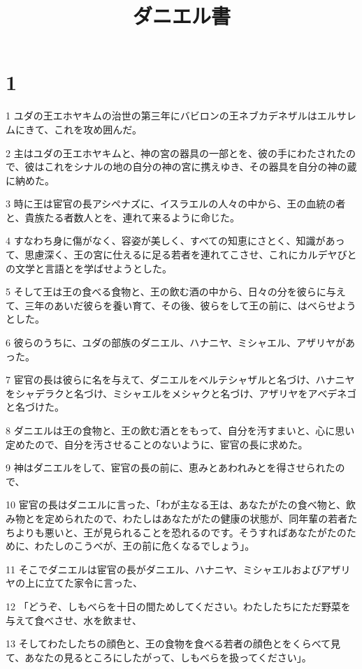 

\title{ダニエル書}


\chapter{1}

\par 1 ユダの王エホヤキムの治世の第三年にバビロンの王ネブカデネザルはエルサレムにきて、これを攻め囲んだ。
\par 2 主はユダの王エホヤキムと、神の宮の器具の一部とを、彼の手にわたされたので、彼はこれをシナルの地の自分の神の宮に携えゆき、その器具を自分の神の蔵に納めた。
\par 3 時に王は宦官の長アシペナズに、イスラエルの人々の中から、王の血統の者と、貴族たる者数人とを、連れて来るように命じた。
\par 4 すなわち身に傷がなく、容姿が美しく、すべての知恵にさとく、知識があって、思慮深く、王の宮に仕えるに足る若者を連れてこさせ、これにカルデヤびとの文学と言語とを学ばせようとした。
\par 5 そして王は王の食べる食物と、王の飲む酒の中から、日々の分を彼らに与えて、三年のあいだ彼らを養い育て、その後、彼らをして王の前に、はべらせようとした。
\par 6 彼らのうちに、ユダの部族のダニエル、ハナニヤ、ミシャエル、アザリヤがあった。
\par 7 宦官の長は彼らに名を与えて、ダニエルをベルテシャザルと名づけ、ハナニヤをシャデラクと名づけ、ミシャエルをメシャクと名づけ、アザリヤをアベデネゴと名づけた。
\par 8 ダニエルは王の食物と、王の飲む酒とをもって、自分を汚すまいと、心に思い定めたので、自分を汚させることのないように、宦官の長に求めた。
\par 9 神はダニエルをして、宦官の長の前に、恵みとあわれみとを得させられたので、
\par 10 宦官の長はダニエルに言った、「わが主なる王は、あなたがたの食べ物と、飲み物とを定められたので、わたしはあなたがたの健康の状態が、同年輩の若者たちよりも悪いと、王が見られることを恐れるのです。そうすればあなたがたのために、わたしのこうべが、王の前に危くなるでしょう」。
\par 11 そこでダニエルは宦官の長がダニエル、ハナニヤ、ミシャエルおよびアザリヤの上に立てた家令に言った、
\par 12 「どうぞ、しもべらを十日の間ためしてください。わたしたちにただ野菜を与えて食べさせ、水を飲ませ、
\par 13 そしてわたしたちの顔色と、王の食物を食べる若者の顔色とをくらべて見て、あなたの見るところにしたがって、しもべらを扱ってください」。
